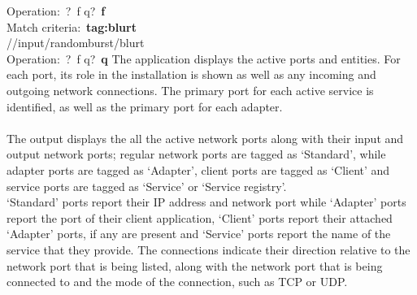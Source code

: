 Operation:\ \openSq{}?\ f q\closeSq{}?\ \textbf{f}\\
Match criteria:\ \textbf{tag:blurt}\\
/\serviceName/input/randomburst/blurt\\
Operation:\ \openSq{}?\ f q\closeSq{}?\ \textbf{q}
\outputEnd
{}
\condPage
{}
The application  displays the active \yarp{} ports and
\mplusm{} entities.
For each \yarp{} port, its role in the \mplusm{} installation is shown as well as any
incoming and outgoing \yarp{} network connections.
The primary port for each active service is identified, as well as the primary port for
each adapter.\\

\insertFullUtilityParameters\\

The output displays the all the active \yarp{} network ports along with their input and
output \yarp{} network ports; regular \yarp{} network ports are tagged as `Standard',
while \mplusm{} adapter ports are tagged as `Adapter', \mplusm{} client ports are tagged
as `Client' and \mplusm{} service ports are tagged as `Service' or `Service registry'.\\

`Standard' ports report their IP address and network port while `Adapter' ports report
the \mplusm{} port of their client application, `Client' ports report their attached
`Adapter' ports, if any are present and `Service' ports report the name of the \mplusm{}
service that they provide.
The connections indicate their direction relative to the \yarp{} network port that is
being listed, along with the \yarp{} network port that is being connected to and the mode
of the connection, such as TCP or UDP.\\

